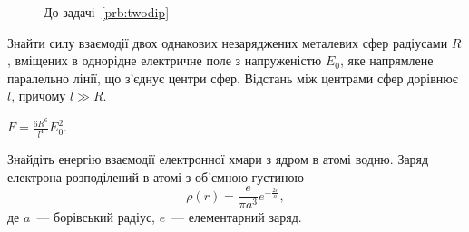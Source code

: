 	\begin{figure}[!h]\centering
		\caption{До задачі~\ref{prb:twodip}}
		\label{twodip}
	\end{figure}



\begin{problem}%
Знайти силу взаємодії двох однакових незаряджених металевих сфер радіусами $R$, вміщених в однорідне електричне поле з напруженістю $E_0$, яке напрямлене паралельно лінії, що з'єднує центри сфер. Відстань між центрами сфер дорівнює $l$, причому $l \gg R$.

\begin{solution}
	$F = \frac{6R^6}{l^4} E_0^2$.
\end{solution}
\end{problem}

\begin{problem}
    Знайдіть енергію взаємодії електронної хмари з ядром в атомі водню. Заряд електрона розподілений в атомі з об'ємною густиною
    \[
        \rho(r) = \frac{e}{\pi a^3}e^{-\frac{2r}{a}},
   \]
де $a$~--- борівський радіус, $e$~--- елементарний заряд.
\end{problem}



